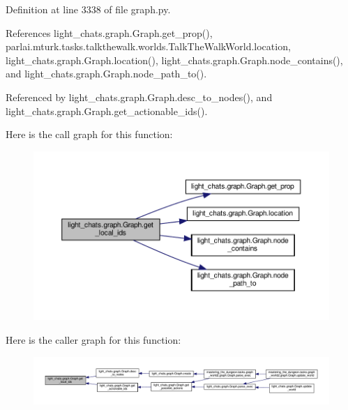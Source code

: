 Definition at line 3338 of file graph.\+py.



References light\+\_\+chats.\+graph.\+Graph.\+get\+\_\+prop(), parlai.\+mturk.\+tasks.\+talkthewalk.\+worlds.\+Talk\+The\+Walk\+World.\+location, light\+\_\+chats.\+graph.\+Graph.\+location(), light\+\_\+chats.\+graph.\+Graph.\+node\+\_\+contains(), and light\+\_\+chats.\+graph.\+Graph.\+node\+\_\+path\+\_\+to().



Referenced by light\+\_\+chats.\+graph.\+Graph.\+desc\+\_\+to\+\_\+nodes(), and light\+\_\+chats.\+graph.\+Graph.\+get\+\_\+actionable\+\_\+ids().

Here is the call graph for this function\+:
\nopagebreak
\begin{figure}[H]
\begin{center}
\leavevmode
\includegraphics[width=350pt]{classlight__chats_1_1graph_1_1Graph_a4fa84ee088a8086336cf51a1c41a0477_cgraph}
\end{center}
\end{figure}
Here is the caller graph for this function\+:
\nopagebreak
\begin{figure}[H]
\begin{center}
\leavevmode
\includegraphics[width=350pt]{classlight__chats_1_1graph_1_1Graph_a4fa84ee088a8086336cf51a1c41a0477_icgraph}
\end{center}
\end{figure}
\mbox{\label{classlight__chats_1_1graph_1_1Graph_ae8a732327aed100ff96fb2349246738c}} 
